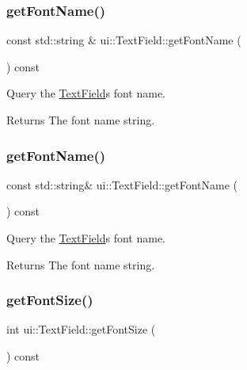 \subsubsection{\texorpdfstring{get\+Font\+Name()}{getFontName()}\hspace{0.1cm}{\footnotesize\ttfamily [1/2]}}
{\footnotesize\ttfamily const std\+::string \& ui\+::\+Text\+Field\+::get\+Font\+Name (\begin{DoxyParamCaption}{ }\end{DoxyParamCaption}) const}



Query the \hyperlink{classui_1_1TextField}{Text\+Field}\textquotesingle{}s font name. 

\begin{DoxyReturn}{Returns}
The font name string. 
\end{DoxyReturn}
\mbox{\label{classui_1_1TextField_ae02879ddcc02e9d259509db2ba8c61f8}} 
\subsubsection{\texorpdfstring{get\+Font\+Name()}{getFontName()}\hspace{0.1cm}{\footnotesize\ttfamily [2/2]}}
{\footnotesize\ttfamily const std\+::string\& ui\+::\+Text\+Field\+::get\+Font\+Name (\begin{DoxyParamCaption}{ }\end{DoxyParamCaption}) const}



Query the \hyperlink{classui_1_1TextField}{Text\+Field}\textquotesingle{}s font name. 

\begin{DoxyReturn}{Returns}
The font name string. 
\end{DoxyReturn}
\mbox{\label{classui_1_1TextField_a92c02fd871c8c39af214b6796278f09e}} 
\subsubsection{\texorpdfstring{get\+Font\+Size()}{getFontSize()}\hspace{0.1cm}{\footnotesize\ttfamily [1/2]}}
{\footnotesize\ttfamily int ui\+::\+Text\+Field\+::get\+Font\+Size (\begin{DoxyParamCaption}{ }\end{DoxyParamCaption}) const}



